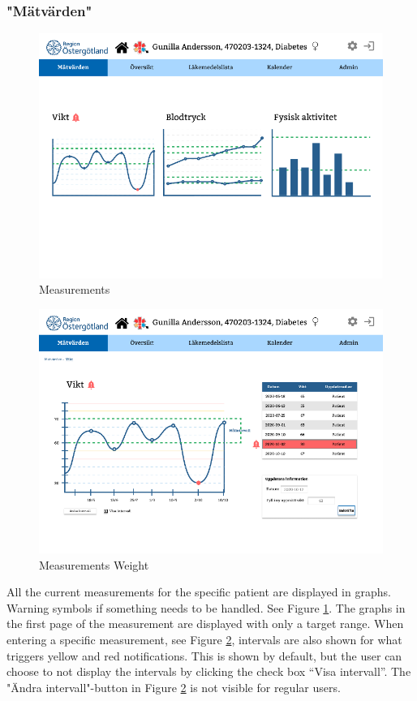 \documentclass{scrreprt}
\begin{document}
\subsubsection{"Mätvärden"}
\begin{figure}[h!]
    \centering
    \includegraphics[width=15cm]{meas.png}
    \caption{Measurements}
    \label{fig: meas}
\end{figure}

\begin{figure}[h!]
    \centering
    \includegraphics[width=15cm]{measweight.png}
    \caption{Measurements Weight}
    \label{fig: measweight}
\end{figure}
All the current measurements for the specific patient are displayed in graphs. Warning symbols if something needs to be handled. See Figure \ref{fig: meas}.
The graphs in the first page of the measurement are displayed with only a target range. When entering a specific measurement, see Figure \ref{fig: measweight}, intervals are also shown for what triggers yellow and red notifications. This is shown by default, but the user can choose to not display the intervals by clicking the check box “Visa intervall”. The "Ändra intervall"-button in Figure \ref{fig: measweight} is not visible for regular users.
\end{document}
